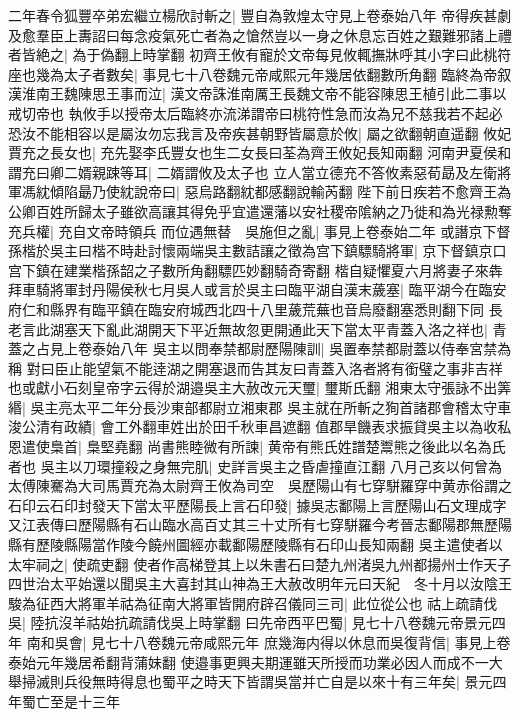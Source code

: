 二年春令狐豐卒弟宏繼立楊欣討斬之|{
	豐自為敦煌太守見上卷泰始八年}
帝得疾甚劇及愈羣臣上夀詔曰每念疫氣死亡者為之愴然豈以一身之休息忘百姓之艱難邪諸上禮者皆絶之|{
	為于偽翻上時掌翻}
初齊王攸有寵於文帝每見攸輒撫牀呼其小字曰此桃符座也幾為太子者數矣|{
	事見七十八卷魏元帝咸熙元年幾居依翻數所角翻}
臨終為帝叙漢淮南王魏陳思王事而泣|{
	漢文帝誅淮南厲王長魏文帝不能容陳思王植引此二事以戒切帝也}
執攸手以授帝太后臨終亦流涕謂帝曰桃符性急而汝為兄不慈我若不起必恐汝不能相容以是屬汝勿忘我言及帝疾甚朝野皆屬意於攸|{
	屬之欲翻朝直遥翻}
攸妃賈充之長女也|{
	充先娶李氏豐女也生二女長曰荃為齊王攸妃長知兩翻}
河南尹夏侯和謂充曰卿二婿親踈等耳|{
	二婿謂攸及太子也}
立人當立德充不答攸素惡荀勗及左衛將軍馮紞傾陷朂乃使紞說帝曰|{
	惡烏路翻紞都感翻說輸芮翻}
陛下前日疾若不愈齊王為公卿百姓所歸太子雖欲高讓其得免乎宜遣還藩以安社稷帝隂納之乃徙和為光禄勲奪充兵權|{
	充自文帝時領兵}
而位遇無替　吳施但之亂|{
	事見上卷泰始二年}
或譖京下督孫楷於吳主曰楷不時赴討懷兩端吳主數詰讓之徵為宫下鎮驃騎將軍|{
	京下督鎮京口宫下鎮在建業楷孫韶之子數所角翻驃匹妙翻騎奇寄翻}
楷自疑懼夏六月將妻子來犇拜車騎將軍封丹陽侯秋七月吳人或言於吳主曰臨平湖自漢末薉塞|{
	臨平湖今在臨安府仁和縣界有臨平鎮在臨安府城西北四十八里薉荒蕪也音烏廢翻塞悉則翻下同}
長老言此湖塞天下亂此湖開天下平近無故忽更開通此天下當太平青蓋入洛之祥也|{
	青蓋之占見上卷泰始八年}
吳主以問奉禁都尉歷陽陳訓|{
	吳置奉禁都尉蓋以侍奉宮禁為稱}
對曰臣止能望氣不能逹湖之開塞退而告其友曰青蓋入洛者將有銜璧之事非吉祥也或獻小石刻皇帝字云得於湖邉吳主大赦改元天璽|{
	璽斯氏翻}
湘東太守張詠不出筭緡|{
	吳主亮太平二年分長沙東部都尉立湘東郡}
吳主就在所斬之狥首諸郡會稽太守車浚公清有政績|{
	會工外翻車姓出於田千秋車昌遮翻}
值郡旱饑表求振貸吳主以為收私恩遣使梟首|{
	梟堅堯翻}
尚書熊睦微有所諫|{
	黄帝有熊氏姓譜楚鬻熊之後此以名為氏者也}
吳主以刀環撞殺之身無完肌|{
	史詳言吳主之昏虐撞直江翻}
八月己亥以何曾為太傅陳騫為大司馬賈充為太尉齊王攸為司空　吳歷陽山有七穿駢羅穿中黄赤俗謂之石印云石印封發天下當太平歷陽長上言石印發|{
	據吳志鄱陽上言歷陽山石文理成字又江表傳曰歷陽縣有石山臨水高百丈其三十丈所有七穿駢羅今考晉志鄱陽郡無歷陽縣有歷陵縣陽當作陵今饒州圖經亦載鄱陽歷陵縣有石印山長知兩翻}
吳主遣使者以太牢祠之|{
	使疏吏翻}
使者作高梯登其上以朱書石曰楚九州渚吳九州都揚州士作天子四世治太平始還以聞吳主大喜封其山神為王大赦改明年元曰天紀　冬十月以汝陰王駿為征西大將軍羊祜為征南大將軍皆開府辟召儀同三司|{
	此位從公也}
祜上疏請伐吳|{
	陸抗沒羊祜始抗疏請伐吳上時掌翻}
曰先帝西平巴蜀|{
	見七十八卷魏元帝景元四年}
南和吳會|{
	見七十八卷魏元帝咸熙元年}
庶幾海内得以休息而吳復背信|{
	事見上卷泰始元年幾居希翻背蒲妹翻}
使邉事更興夫期運雖天所授而功業必因人而成不一大舉掃滅則兵役無時得息也蜀平之時天下皆謂吳當并亡自是以來十有三年矣|{
	景元四年蜀亡至是十三年}
